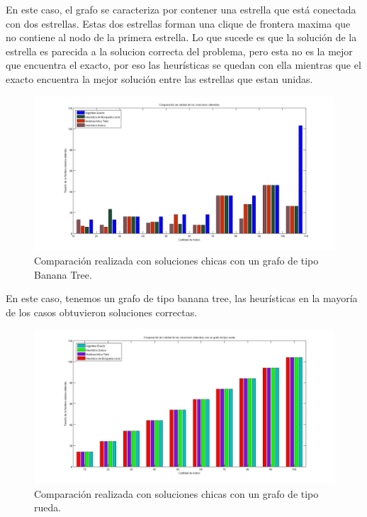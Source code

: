 En este caso, el grafo se caracteriza por contener una estrella que está conectada con dos estrellas. Estas dos estrellas forman una clique de frontera maxima que no contiene al nodo de la primera estrella. Lo que sucede es que la solución de la estrella es parecida a la solucion correcta del problema, pero esta no es la mejor que encuentra el exacto, por eso las heurísticas se quedan con ella mientras que el exacto encuentra la mejor solución entre las estrellas que estan unidas.


 \begin{figure}[H] %
\begin{center}
\includegraphics[width=400pt]{../imgs/calidadSolucionesChicas3.jpg}
\caption{Comparación realizada con soluciones chicas con un grafo de tipo Banana Tree.}
\end{center}
\end{figure}

En este caso, tenemos un grafo de tipo banana tree, las heurísticas en la mayoría de los casos obtuvieron soluciones correctas.

 \begin{figure}[H] %
\begin{center}
\includegraphics[width=400pt]{../imgs/calidadSolucionesChicas2.jpg}
\caption{Comparación realizada con soluciones chicas con un grafo de tipo rueda.}
\end{center}
\end{figure}

